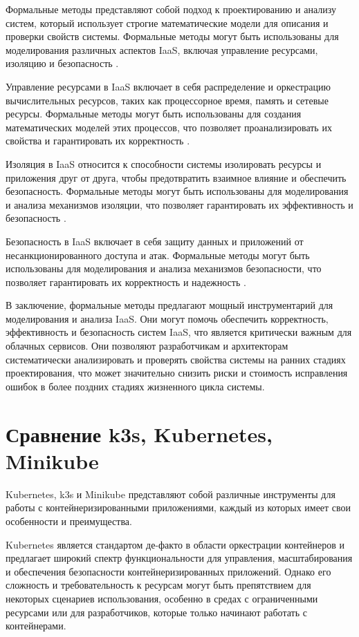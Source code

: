 Формальные методы представляют собой подход к проектированию и анализу
систем, который использует строгие математические модели для описания
и проверки свойств системы. Формальные методы могут быть использованы
для моделирования различных аспектов IaaS, включая управление ресурсами,
изоляцию и безопасность 
\cite{bijon2014formal, amato2018improving, de2012formal}.

Управление ресурсами в IaaS включает в себя распределение и
оркестрацию вычислительных ресурсов, таких как процессорное время,
память и сетевые ресурсы. Формальные методы могут быть использованы
для создания математических моделей этих процессов, что позволяет
проанализировать их свойства и гарантировать их корректность
\cite{de2012formal, turin2023predicting}.

Изоляция в IaaS относится к способности системы изолировать ресурсы и
приложения друг от друга, чтобы предотвратить взаимное влияние и
обеспечить безопасность. Формальные методы могут быть использованы
для моделирования и анализа механизмов изоляции, что позволяет
гарантировать их эффективность и безопасность \cite{bijon2014formal}.

Безопасность в IaaS включает в себя защиту данных и приложений от
несанкционированного доступа и атак. Формальные методы могут быть
использованы для моделирования и анализа механизмов безопасности,
что позволяет гарантировать их корректность и надежность
\cite{amato2018improving}.

В заключение, формальные методы предлагают мощный инструментарий для
моделирования и анализа IaaS. Они могут помочь обеспечить корректность,
эффективность и безопасность систем IaaS, что является критически важным
для облачных сервисов. Они позволяют разработчикам и архитекторам
систематически анализировать и проверять свойства системы на ранних
стадиях проектирования, что может значительно снизить риски и стоимость
исправления ошибок в более поздних стадиях жизненного цикла системы.

\section{Сравнение k3s, Kubernetes, Minikube}

Kubernetes, k3s и Minikube представляют собой различные инструменты
для работы с контейнеризированными приложениями, каждый из которых
имеет свои особенности и преимущества.

Kubernetes является стандартом де-факто в области оркестрации
контейнеров и предлагает широкий спектр функциональности для управления,
масштабирования и обеспечения безопасности контейнеризированных
приложений. Однако его сложность и требовательность к ресурсам могут
быть препятствием для некоторых сценариев использования, особенно в
средах с ограниченными ресурсами или для разработчиков, которые только
начинают работать с контейнерами.

